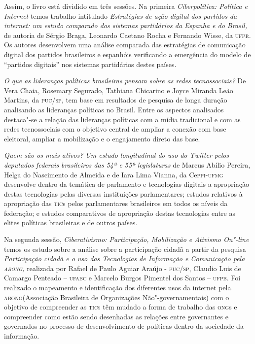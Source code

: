 Assim, o livro está dividido em três sessões. Na primeira
\emph{Ciberpolítica: \emph{Política e Internet }}temos trabalho
intitulado \emph{Estratégias de ação digital dos partidos da internet:
um estudo comparado dos sistemas partidários da Espanha e do Brasil,} de
autoria de Sérgio Braga, Leonardo Caetano Rocha e Fernando Wisse, da
\textsc{ufpr}. Os autores desenvolvem uma análise comparada das estratégias de
comunicação digital dos partidos brasileiros e espanhóis verificando a
emergência do modelo de ``partidos digitais'' nos sistemas partidários
destes países.

\emph{O que as lideranças políticas brasileiras pensam sobre as redes
tecnossociais?} De Vera Chaia, Rosemary Segurado, Tathiana Chicarino e
Joyce Miranda Leão Martins, da \textsc{puc}/\textsc{sp}, tem base em resultados de
pesquisa de longa duração analisando as lideranças políticas no Brasil.
Entre os aspectos analisados destaca"-se a relação das lideranças
políticas com a mídia tradicional e com as redes tecnossociais com o
objetivo central de ampliar a conexão com base eleitoral, ampliar a
mobilização e o engajamento direto das base.

\emph{Quem são os mais ativos? Um estudo longitudinal do uso do Twitter
pelos deputados federais brasileiros das 54ª e 55ª legislaturas} de
Marcus Abílio Pereira, Helga do Nascimento de Almeida e de Iara Lima
Vianna, da Ce\textsc{ppi}-\textsc{ufmg} desenvolve dentro da temática de parlamento e
tecnologias digitais a apropriação destas tecnologias pelas diversas
instituições parlamentares; estudos relativos à apropriação das \textsc{tic}s
pelos parlamentares brasileiros em todos os níveis da federação; e
estudos comparativos de apropriação destas tecnologias entre as elites
políticas brasileiras e de outros países.

Na segunda sessão, \emph{Ciberativismo: Participação, Mobilização e
Ativismo On"-line} temos os estudo sobre a análise sobre a participação
cidadã a partir da pesquisa \emph{Participação cidadã e o uso das
Tecnologias de Informação e Comunicação pela \textsc{abong},} realizada por
Rafael de Paulo Aguiar Araújo - \textsc{puc}/\textsc{sp}, Claudio Luis de Camargo Penteado
-- \textsc{ufabc} e Marcelo Burgos Pimentel dos Santos -- \textsc{ufpb}. Foi realizado o
mapeamento e identificação dos diferentes usos da internet pela
\textsc{abong}(Associação Brasileira de Organizações Não"-governamentais) com o
objetivo de compreender as \textsc{tic}s têm mudado a forma de trabalho das \textsc{ong}s
e compreender como estão sendo desenhadas as relações entre governantes
e governados no processo de desenvolvimento de políticas dentro da
sociedade da informação.

